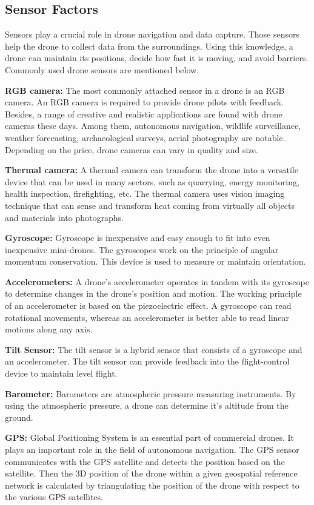 \subsection{Sensor Factors}
Sensors play a crucial role in drone navigation and data capture. Those sensors help the drone to collect data from the surroundings. Using this knowledge, a drone can maintain its positions, decide how fast it is moving, and avoid barriers. Commonly used drone sensors are mentioned below.

\textbf{RGB camera:} 
The most commonly attached sensor in a drone is an RGB camera. An RGB camera is required to provide drone pilots with feedback. Besides, a range of creative and realistic applications are found with drone cameras these days. Among them, autonomous navigation, wildlife surveillance, weather forecasting, archaeological surveys, aerial photography are notable. Depending on the price, drone cameras can vary in quality and size.

\textbf{Thermal camera:}
A thermal camera can transform the drone into a versatile device that can be used in many sectors, such as quarrying, energy monitoring, health inspection, firefighting, etc. The thermal camera uses vision imaging technique that can sense and transform heat coming from virtually all objects and materials into photographs. 

\textbf{Gyroscope:}
Gyroscope is inexpensive and easy enough to fit into even inexpensive mini-drones. The gyroscopes work on the principle of angular momentum conservation. This device is used to measure or maintain orientation.

\textbf{Accelerometers:}
A drone's accelerometer operates in tandem with its gyroscope to determine changes in the drone's position and motion. The working principle of an accelerometer is based on the piezoelectric effect. A gyroscope can read rotational movements, whereas an accelerometer is better able to read linear motions along any axis. 

\textbf{Tilt Sensor:}
The tilt sensor is a hybrid sensor that consists of a gyroscope and an accelerometer. The tilt sensor can provide feedback into the flight-control device to maintain level flight.

\textbf{Barometer:}
Barometers are atmospheric pressure measuring instruments. By using the atmospheric pressure, a drone can determine it's altitude from the ground. 

\textbf{GPS:}
Global Positioning System is an essential part of commercial drones. It plays an important role in the field of autonomous navigation. The GPS sensor communicates with the GPS satellite and detects the position based on the satellite. Then the 3D position of the drone within a given geospatial reference network is calculated by triangulating the position of the drone with respect to the various GPS satellites.

